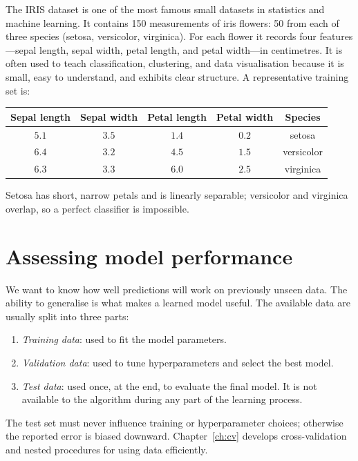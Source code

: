 \documentclass[a4paper, 12pt]{book}
\begin{document}
\begin{example}[IRIS]
    The IRIS dataset is one of the most famous small datasets in statistics and machine learning. It contains 150 measurements of iris flowers: 50 from each of three species (setosa, versicolor, virginica). For each flower it records four features---sepal length, sepal width, petal length, and petal width---in centimetres. It is often used to teach classification, clustering, and data visualisation because it is small, easy to understand, and exhibits clear structure.
    A representative training set is:
    \begin{center}
    \begin{tabular}{@{}ccccc@{}}
        \toprule
        Sepal length & Sepal width & Petal length & Petal width & Species \\
        \midrule
        $5.1$ & $3.5$ & $1.4$ & $0.2$ & setosa \\
        $6.4$ & $3.2$ & $4.5$ & $1.5$ & versicolor \\
        $6.3$ & $3.3$ & $6.0$ & $2.5$ & virginica \\
        \bottomrule
    \end{tabular}
    \end{center}
    Setosa has short, narrow petals and is linearly separable; versicolor and
    virginica overlap, so a perfect classifier is impossible.
\end{example}


\section{}

\section{Assessing model performance}

We want to know how well predictions will work on previously unseen data. The ability
to generalise is what makes a learned model useful. The available data are usually
split into three parts:
\begin{enumerate}
    \item \emph{Training data}: used to fit the model parameters.
    \item \emph{Validation data}: used to tune hyperparameters and select the best
    model.
    \item \emph{Test data}: used once, at the end, to evaluate the final model. It is
    not available to the algorithm during any part of the learning process.
\end{enumerate}
The test set must never influence training or hyperparameter choices; otherwise the
reported error is biased downward. Chapter~\ref{ch:cv} develops cross-validation and
nested procedures for using data efficiently.
\end{document}
